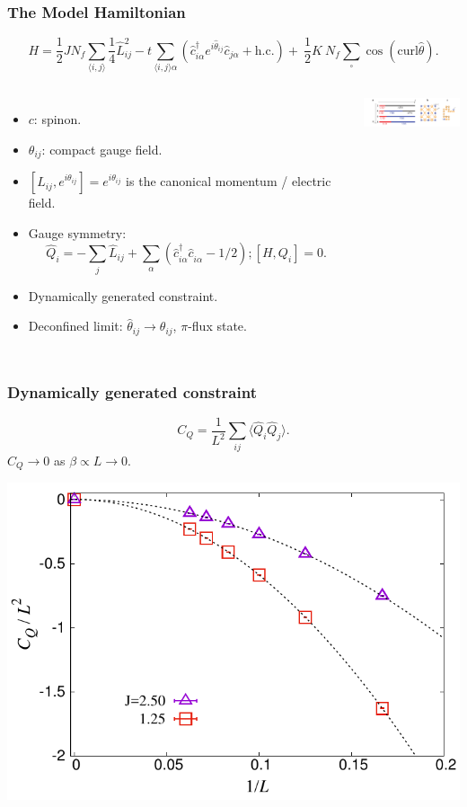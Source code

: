 \documentclass[xcolor=table, 10pt, aspectratio=169]{beamer}
\begin{document}
\begin{frame}
  \frametitle{The Model Hamiltonian}
  \[
  H=\frac{1}{2}JN_{f}\sum_{\langle i,j \rangle} \frac 1 4 \hat{L}^{2}_{ij}-t\sum_{\langle i,j \rangle\alpha}\left(\hat{c}^{\dagger}_{i\alpha}e^{i\hat{\theta}_{ij}}\hat{c}_{j\alpha}+\text{h.c.}\right)
  +\ \frac{1}{2}K\ N_f\sum_{\square}\cos \left( \text{curl} \hat{\theta} \right).
\]
\begin{columns}
  \begin{itemize}
    \item $c$: spinon.
    \item $\theta_{ij}$: compact gauge field.
    \item $[L_{ij}, e^{i\theta_{ij}}]=e^{i\theta_{ij}}$ is the canonical momentum / electric field.
    \item Gauge symmetry:
    \[\hat{Q}_{i} = -\sum_{j}\hat{L}_{ij} + \sum_{\alpha} \left( \hat{c}^{\dagger}_{i\alpha}\hat{c}^{\phantom\dagger}_{i\alpha} - 1/2 \right);[H, Q_i] = 0.\]
    \item Dynamically generated constraint.
    \item Deconfined limit: $\hat\theta_{ij}\rightarrow \theta_{ij}$, $\pi$-flux state.
  \end{itemize}

  \begin{center}
    \includegraphics[width=3cm]{model}
  \end{center}
\end{columns}
\end{frame}

\begin{frame}
  \frametitle{Dynamically generated constraint}
  \[C_{Q} = \frac{1}{L^2} \sum_{ij} \langle \hat{Q}_i \hat{Q}_j\rangle.\]
  $C_Q\rightarrow0$ as $\beta\propto L\rightarrow0$.
  \begin{center}
    \includegraphics[width=.8\textwidth]{n2QQ00}
  \end{center}
\end{frame}
\end{document}

